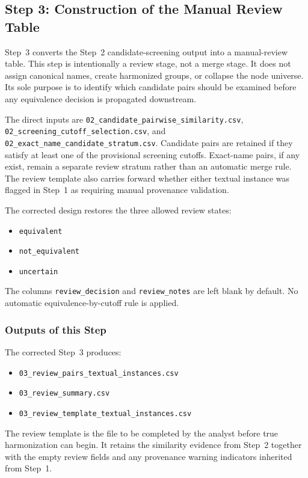 \subsection{Step 3: Construction of the Manual Review Table}
\label{sec:step3_review_table}

Step~3 converts the Step~2 candidate-screening output into a manual-review table. This step is intentionally a review stage, not a merge stage. It does not assign canonical names, create harmonized groups, or collapse the node universe. Its sole purpose is to identify which candidate pairs should be examined before any equivalence decision is propagated downstream.

The direct inputs are \texttt{02\_candidate\_pairwise\_similarity.csv}, \texttt{02\_screening\_cutoff\_selection.csv}, and \texttt{02\_exact\_name\_candidate\_stratum.csv}. Candidate pairs are retained if they satisfy at least one of the provisional screening cutoffs. Exact-name pairs, if any exist, remain a separate review stratum rather than an automatic merge rule. The review template also carries forward whether either textual instance was flagged in Step~1 as requiring manual provenance validation.

The corrected design restores the three allowed review states:
\begin{itemize}
    \item \texttt{equivalent}
    \item \texttt{not\_equivalent}
    \item \texttt{uncertain}
\end{itemize}
The columns \texttt{review\_decision} and \texttt{review\_notes} are left blank by default. No automatic equivalence-by-cutoff rule is applied.

\subsubsection{Outputs of this Step}
\label{sec:step3_outputs}

The corrected Step~3 produces:
\begin{itemize}
    \item \texttt{03\_review\_pairs\_textual\_instances.csv}
    \item \texttt{03\_review\_summary.csv}
    \item \texttt{03\_review\_template\_textual\_instances.csv}
\end{itemize}

The review template is the file to be completed by the analyst before true harmonization can begin. It retains the similarity evidence from Step~2 together with the empty review fields and any provenance warning indicators inherited from Step~1.

